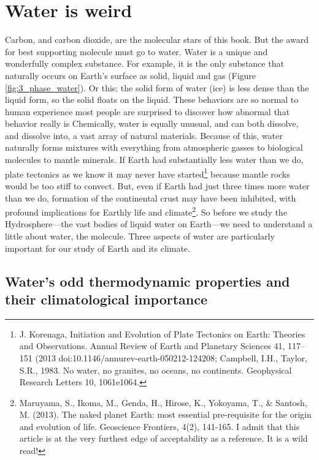 \documentclass[amstex,12pt]{book}
\begin{document}
\section{Water is weird}
Carbon, and carbon dioxide, are the molecular stars of this book. But the award for best supporting molecule must go to water. Water is a unique and wonderfully complex substance. For example, it is the only substance that naturally occurs on Earth's surface as solid, liquid and gas (Figure \ref{fig:3_phase_water}). Or this: the solid form of water (ice) is less dense than the liquid form, so the solid floats on the liquid. These behaviors are so normal to human experience most people are surprised to discover how abnormal that behavior really is Chemically, water is equally unusual, and can both dissolve, and dissolve into, a vast array of natural materials. Because of this, water naturally forms mixtures with everything from atmospheric gasses to biological molecules to mantle minerals. If Earth had substantially less water than we do, plate tectonics as we know it may never have started\footnote{J. Korenaga, Initiation and Evolution of Plate Tectonics on Earth: Theories and Observations. Annual Review of Earth and Planetary Sciences 41, 117–151 (2013 doi:10.1146/annurev-earth-050212-124208; Campbell, I.H., Taylor, S.R., 1983. No water, no granites, no oceans, no continents. Geophysical Research Letters 10, 1061e1064.} because mantle rocks would be too stiff to convect. But, even if Earth had just three times more water than we do, formation of the continental crust may have been inhibited, with profound implications for Earthly life and climate\footnote{Maruyama, S., Ikoma, M., Genda, H., Hirose, K., Yokoyama, T., \& Santosh, M. (2013). The naked planet Earth: most essential pre-requisite for the origin and evolution of life. Geoscience Frontiers, 4(2), 141-165. I admit that this article is at the very furthest edge of acceptability as a reference. It is a wild read!}. So before we study the Hydrosphere---the vast bodies of liquid water on Earth---we need to understand a little about water, the molecule. Three aspects of water are particularly important for our study of Earth and its climate. 
\subsection{Water's odd thermodynamic properties and their climatological importance}
\end{document}
